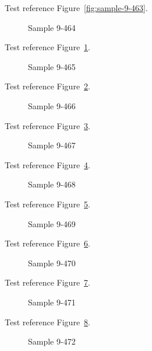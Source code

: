 Test reference Figure~\ref{fig:sample-9-463}.

\begin{figure}[tbhp]
\caption{Sample 9-464}
\label{fig:sample-9-464}
\end{figure}

Test reference Figure~\ref{fig:sample-9-464}.

\begin{figure}[tbhp]
\caption{Sample 9-465}
\label{fig:sample-9-465}
\end{figure}

Test reference Figure~\ref{fig:sample-9-465}.

\begin{figure}[tbhp]
\caption{Sample 9-466}
\label{fig:sample-9-466}
\end{figure}

Test reference Figure~\ref{fig:sample-9-466}.

\begin{figure}[tbhp]
\caption{Sample 9-467}
\label{fig:sample-9-467}
\end{figure}

Test reference Figure~\ref{fig:sample-9-467}.

\begin{figure}[tbhp]
\caption{Sample 9-468}
\label{fig:sample-9-468}
\end{figure}

Test reference Figure~\ref{fig:sample-9-468}.

\begin{figure}[tbhp]
\caption{Sample 9-469}
\label{fig:sample-9-469}
\end{figure}

Test reference Figure~\ref{fig:sample-9-469}.

\begin{figure}[tbhp]
\caption{Sample 9-470}
\label{fig:sample-9-470}
\end{figure}

Test reference Figure~\ref{fig:sample-9-470}.

\begin{figure}[tbhp]
\caption{Sample 9-471}
\label{fig:sample-9-471}
\end{figure}

Test reference Figure~\ref{fig:sample-9-471}.

\begin{figure}[tbhp]
\caption{Sample 9-472}
\label{fig:sample-9-472}
\end{figure}

